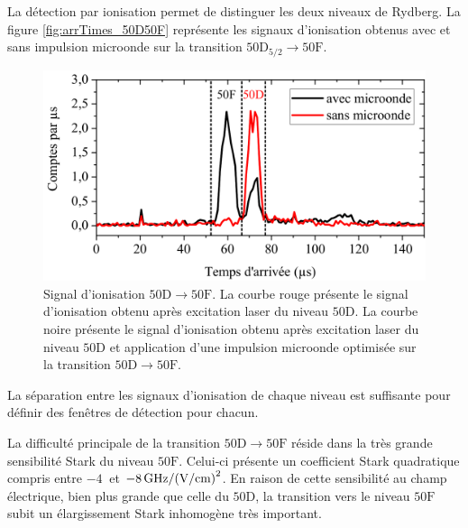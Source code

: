 La détection par ionisation permet de distinguer les deux niveaux de Rydberg.
La figure \eqref{fig:arrTimes_50D50F} représente les signaux d'ionisation obtenus avec et sans impulsion microonde sur la transition $\mathrm{50D_{5/2} \rightarrow 50F}$.
%
\begin{figure}[!h]
\centering
\includegraphics[width=0.85\linewidth]{figures/circulars/arrTimes_50D50F}
\caption[Signal d'ionisation $\mathrm{50D\rightarrow 50F}$]{
Signal d'ionisation $\mathrm{50D\rightarrow 50F}$.
La courbe rouge présente le signal d'ionisation obtenu après excitation laser du niveau $\mathrm{50D}$.
La courbe noire présente le signal d'ionisation obtenu après excitation laser du niveau $\mathrm{50D}$ et application d'une impulsion microonde optimisée sur la transition $\mathrm{50D \rightarrow 50F}$.
}
\label{fig:arrTimes_50D50F}
\end{figure}
%
La séparation entre les signaux d'ionisation de chaque niveau est suffisante pour définir des fenêtres de détection pour chacun.

La difficulté principale de la transition $\mathrm{50D} \rightarrow\mathrm{50F}$ réside dans la très grande sensibilité Stark du niveau $\mathrm{50F}$.
Celui-ci présente un coefficient Stark quadratique compris entre $\SI{-4}{}$ et $\SI{-8}{\GHz/(\V/\cm)\squared}$.
En raison de cette sensibilité au champ électrique, bien plus grande que celle du $\mathrm{50D}$, la transition vers le niveau $\mathrm{50F}$ subit un élargissement Stark inhomogène très important.

